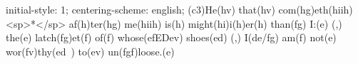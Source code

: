 initial-style: 1;
centering-scheme: english;
(c3)He(hv) that(hv) com(hg)eth(hiih) <sp>*</sp> af(h)ter(hg) me(hiih) is(h) might(hi)i(h)er(h) than(fg) I:(e) (,) the(e) latch(fg)et(f) of(f) whose(efEDev) shoes(ed) (,) I(de/fg) am(f) not(e) wor(fv)thy(ed~) to(ev) un(fgf)loose.(e)

